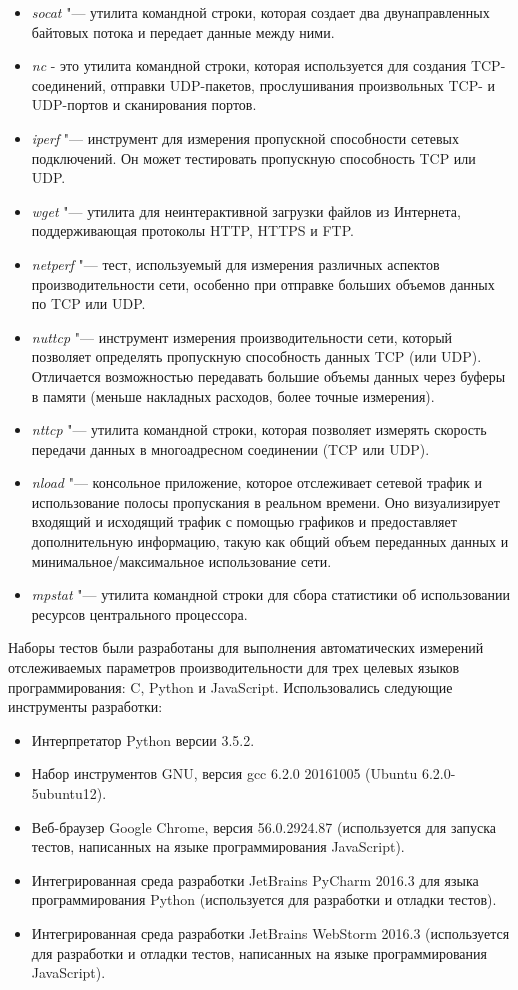 \begin{itemize}
	\item \textit{socat} "--- утилита командной строки, которая создает два двунаправленных байтовых потока и передает данные между ними.
	\item \textit{nc} - это утилита командной строки, которая используется для создания TCP-соединений, отправки UDP-пакетов, прослушивания произвольных TCP- и UDP-портов и сканирования портов.
	\item \textit{iperf} "--- инструмент для измерения пропускной способности сетевых подключений. Он может тестировать пропускную способность TCP или UDP.
	\item \textit{wget} "--- утилита для неинтерактивной загрузки файлов из Интернета, поддерживающая протоколы HTTP, HTTPS и FTP.
	\item \textit{netperf} "--- тест, используемый для измерения различных аспектов производительности сети, особенно при отправке больших объемов данных по TCP или UDP.
	\item \textit{nuttcp} "--- инструмент измерения производительности сети, который позволяет определять пропускную способность данных TCP (или UDP). Отличается возможностью передавать большие объемы данных через буферы в памяти (меньше накладных расходов, более точные измерения).
	\item \textit{nttcp} "--- утилита командной строки, которая позволяет измерять скорость передачи данных в многоадресном соединении (TCP или UDP).
	\item \textit{nload} "--- консольное приложение, которое отслеживает сетевой трафик и использование полосы пропускания в реальном времени. Оно визуализирует входящий и исходящий трафик с помощью графиков и предоставляет дополнительную информацию, такую ​​как общий объем переданных данных и минимальное/максимальное использование сети.
	\item \textit{mpstat} "--- утилита командной строки для сбора статистики об использовании ресурсов центрального процессора.
\end{itemize}

Наборы тестов были разработаны для выполнения автоматических измерений отслеживаемых параметров производительности для трех целевых языков программирования: C, Python и JavaScript. Использовались следующие инструменты разработки:

\begin{itemize}
	\item Интерпретатор Python версии 3.5.2.
	\item Набор инструментов GNU, версия gcc 6.2.0 20161005 (Ubuntu 6.2.0-5ubuntu12).
	\item Веб-браузер Google Chrome, версия 56.0.2924.87 (используется для запуска тестов, написанных на языке программирования JavaScript).
	\item Интегрированная среда разработки JetBrains PyCharm 2016.3 для языка программирования Python (используется для разработки и отладки тестов).
	\item Интегрированная среда разработки JetBrains WebStorm 2016.3 (используется для разработки и отладки тестов, написанных на языке программирования JavaScript).
\end{itemize}

